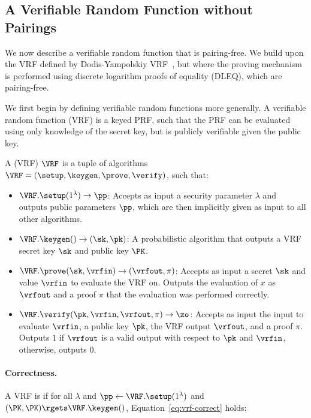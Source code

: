 
\subsection{A Verifiable Random Function without Pairings}

We now describe a verifiable random function that is pairing-free.
We build upon the VRF defined by Dodis-Yampolskiy VRF~\cite{DodisY05},
but where the proving mechanism is performed using discrete logarithm proofs of equality (DLEQ),
which are pairing-free.

We first begin by defining verifiable random functions more generally.
A verifiable random function (VRF) is a keyed PRF,
such that the PRF can be evaluated using only knowledge of the secret key,
but is publicly verifiable given the public key.

\begin{definition}
A  (VRF) $\VRF$ is a tuple of algorithms
$\VRF = (\setup, \keygen, \prove, \verify)$, such that:

\begin{itemize}
    \item $\VRF.\setup(1^\lambda) \rightarrow \pp$:
Accepts as input a security
parameter $\lambda$ and outputs public parameters $\pp$,
which are then implicitly given as input to all other algorithms.
    \item $\VRF.\keygen() \rightarrow (\sk, \pk)$:
A probabilistic algorithm that outputs a VRF secret key $\sk$ and public key $\PK$.
      \item $\VRF.\prove(\sk, \vrfin) \rightarrow (\vrfout, \pi)$:
Accepts as input a secret $\sk$ and value $\vrfin$ to evaluate the VRF on.
Outputs the evaluation of $x$ as $\vrfout$ and a proof $\pi$ that the evaluation was performed correctly.
      \item $\VRF.\verify(\pk, \vrfin, \vrfout, \pi) \rightarrow \zo$:
Accepts as input the input to evaluate $\vrfin$,
a public key $\pk$,
the VRF output $\vrfout$,
and a proof $\pi$.
Outputs $1$ if $\vrfout$ is a valid output with respect to $\pk$ and $\vrfin$,
otherwise, outputs $0$.
\end{itemize}
\end{definition}

\paragraph{Correctness.}
A VRF is  if for all $\lambda$ and $\pp \gets \VRF.\setup(1^\lambda)$
and $(\PK, \PK) \rgets \VRF.\keygen()$,
Equation~\ref{eq:vrf-correct} holds:

